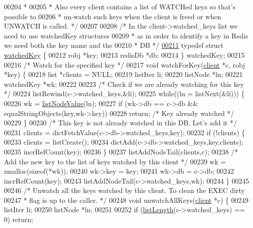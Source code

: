 \begin{DoxyCode}
00204 \textcolor{comment}{ *}
00205 \textcolor{comment}{ * Also every client contains a list of WATCHed keys so that's possible to}
00206 \textcolor{comment}{ * un-watch such keys when the client is freed or when UNWATCH is called. */}
00207 
00208 \textcolor{comment}{/* In the client->watched\_keys list we need to use watchedKey structures}
00209 \textcolor{comment}{ * as in order to identify a key in Redis we need both the key name and the}
00210 \textcolor{comment}{ * DB */}
\hyperlink{structwatchedKey}{00211} \textcolor{keyword}{typedef} \textcolor{keyword}{struct} \hyperlink{structwatchedKey}{watchedKey} \{
00212     robj *key;
00213     redisDb *db;
00214 \} watchedKey;
00215 
00216 \textcolor{comment}{/* Watch for the specified key */}
00217 \textcolor{keywordtype}{void} watchForKey(\hyperlink{structclient}{client} *c, robj *key) \{
00218     list *clients = NULL;
00219     listIter li;
00220     listNode *ln;
00221     watchedKey *wk;
00222 
00223     \textcolor{comment}{/* Check if we are already watching for this key */}
00224     listRewind(c->watched\_keys,&li);
00225     \textcolor{keywordflow}{while}((ln = listNext(&li))) \{
00226         wk = \hyperlink{adlist_8h_af84cae230e7180ebcda1e2736fce9f65}{listNodeValue}(ln);
00227         \textcolor{keywordflow}{if} (wk->db == c->db && equalStringObjects(key,wk->key))
00228             \textcolor{keywordflow}{return}; \textcolor{comment}{/* Key already watched */}
00229     \}
00230     \textcolor{comment}{/* This key is not already watched in this DB. Let's add it */}
00231     clients = dictFetchValue(c->db->watched\_keys,key);
00232     \textcolor{keywordflow}{if} (!clients) \{
00233         clients = listCreate();
00234         dictAdd(c->db->watched\_keys,key,clients);
00235         incrRefCount(key);
00236     \}
00237     listAddNodeTail(clients,c);
00238     \textcolor{comment}{/* Add the new key to the list of keys watched by this client */}
00239     wk = zmalloc(\textcolor{keyword}{sizeof}(*wk));
00240     wk->key = key;
00241     wk->db = c->db;
00242     incrRefCount(key);
00243     listAddNodeTail(c->watched\_keys,wk);
00244 \}
00245 
00246 \textcolor{comment}{/* Unwatch all the keys watched by this client. To clean the EXEC dirty}
00247 \textcolor{comment}{ * flag is up to the caller. */}
00248 \textcolor{keywordtype}{void} unwatchAllKeys(\hyperlink{structclient}{client} *c) \{
00249     listIter li;
00250     listNode *ln;
00251 
00252     \textcolor{keywordflow}{if} (\hyperlink{adlist_8h_afde0ab079f934670e82119b43120e94b}{listLength}(c->watched\_keys) == 0) \textcolor{keywordflow}{return};

\end{DoxyCode}
